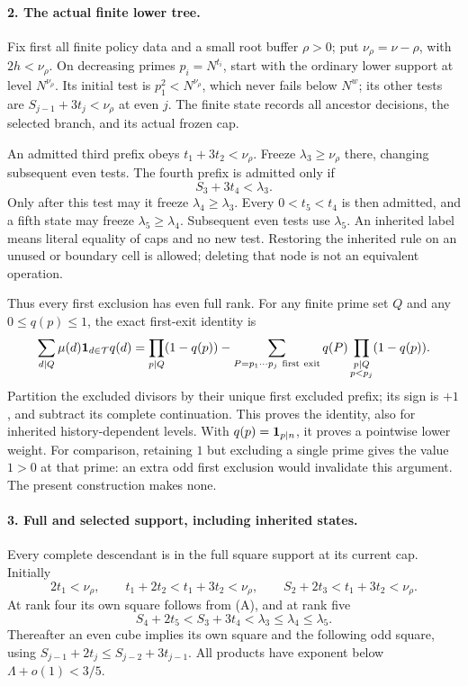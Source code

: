 \paragraph{2. The actual finite lower tree.}
Fix first all finite policy data and a small root buffer
\(\rho>0\); put \(\nu_\rho=\nu-\rho\), with \(2h<\nu_\rho\).
On decreasing primes \(p_i=N^{t_i}\), start with the ordinary lower
support at level \(N^{\nu_\rho}\). Its initial test is \(p_1^2<N^{\nu_\rho}\),
which never fails below \(N^w\); its other tests are
\(S_{j-1}+3t_j<\nu_\rho\) at even \(j\).
The finite state records all ancestor decisions, the selected branch,
and its actual frozen cap.

An admitted third prefix obeys \(t_1+3t_2<\nu_\rho\).
Freeze \(\lambda_3\ge\nu_\rho\) there, changing subsequent even tests.
The fourth prefix is admitted only if
\[
 S_3+3t_4<\lambda_3.                                      \tag{A}
\]
Only after this test may it freeze \(\lambda_4\ge\lambda_3\).
Every \(0<t_5<t_4\) is then admitted, and a fifth state may freeze
\(\lambda_5\ge\lambda_4\). Subsequent even tests use \(\lambda_5\).
An inherited label means literal equality of caps and no new test.
Restoring the inherited rule on an unused or boundary cell is allowed;
deleting that node is not an equivalent operation.

Thus every first exclusion has even full rank. For any finite prime
set \(Q\) and any \(0\le q(p)\le1\), the exact first-exit identity is
\begin{equation}\label{eq:own-lower-even-exit}
 \sum_{d\mid Q}\mu(d){\bf1}_{d\in{\cal T}}q(d)
 =\prod_{p\mid Q}(1-q(p))
 -\sum_{P=p_1\cdots p_j\ {\rm first\ exit}}
       q(P)\prod_{\substack{p\mid Q\\p<p_j}}(1-q(p)).
\end{equation}
Partition the excluded divisors by their unique first excluded prefix;
its sign is \(+1\), and subtract its complete continuation. This proves
the identity, also for inherited history-dependent levels.
With \(q(p)={\bf1}_{p\mid n}\), it proves a pointwise lower weight.
For comparison, retaining \(1\) but excluding a single prime gives
the value \(1>0\) at that prime: an extra odd first exclusion would
invalidate this argument. The present construction makes none.

\paragraph{3. Full and selected support, including inherited states.}
Every complete descendant is in the full square support at its
current cap. Initially
\[
 2t_1<\nu_\rho,\qquad t_1+2t_2<t_1+3t_2<\nu_\rho,\qquad
 S_2+2t_3<t_1+3t_2<\nu_\rho.
\]
At rank four its own square follows from (A), and at rank five
\begin{equation}\label{eq:own-lower-fifth-square}
 S_4+2t_5<S_3+3t_4<\lambda_3\le\lambda_4\le\lambda_5.
\end{equation}
Thereafter an even cube implies its own square and the following odd
square, using
\(S_{j-1}+2t_j\le S_{j-2}+3t_{j-1}\).
All products have exponent below \(\Lambda+o(1)<3/5\).


